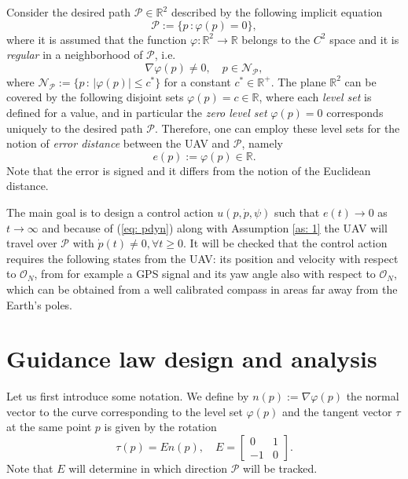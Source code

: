 \documentclass[letterpaper, 10 pt, conference]{ieeeconf}  %
\begin{document}
Consider the desired path $\mathcal{P} \in\mathbb{R}^2$ described by the following implicit equation
\begin{equation}
	\mathcal{P}:= \{p \, : \varphi(p) = 0\},
	\label{eq: P}
\end{equation}
where it is assumed that the function $\varphi : \mathbb{R}^2 \to \mathbb{R}$ belongs to the $C^2$ space and it is \emph{regular} in a neighborhood of $\mathcal{P}$, i.e.
\begin{equation}
	\nabla\varphi(p) \neq 0, \quad p\in \mathcal{N}_{\mathcal{P}},
	\label{eq: reg}
\end{equation}
where $\mathcal{N}_{\mathcal{P}} := \{p \, : \, |\varphi(p)| \leq c^* \}$ for a constant $c^*\in\mathbb{R}^+$.
The plane $\mathbb{R}^2$ can be covered by the following disjoint sets $\varphi(p) = c \in\mathbb{R}$, where each \emph{level set} is defined for a value, and in particular the \emph{zero level set} $\varphi(p) = 0$ corresponds uniquely to the desired path $\mathcal{P}$. Therefore, one can employ these level sets for the notion of \emph{error distance} between the UAV and $\mathcal{P}$, namely
\begin{equation}
	e(p) := \varphi(p) \in \mathbb{R}. \label{eq: e}
\end{equation}
Note that the error is signed and it differs from the notion of the Euclidean distance.

The main goal is to design a control action $u(p, \dot p, \psi)$ such that $e(t) \to 0$ as $t \to \infty$ and because of (\ref{eq: pdyn}) along with Assumption \ref{as: 1} the UAV will travel over $\mathcal{P}$ with $\dot p(t) \neq 0, \forall t\geq 0$. It will be checked that the control action requires the following states from the UAV: its position and velocity with respect to $\mathcal{O}_N$, from for example a GPS signal and its yaw angle also with respect to $\mathcal{O}_N$, which can be obtained from a well calibrated compass in areas far away from the Earth's poles.
\section{Guidance law design and analysis}
\label{sec: ana}
Let us first introduce some notation. We define by $n(p) := \nabla \varphi(p)$ the normal vector to the curve corresponding to the level set $\varphi(p)$ and the tangent vector $\tau$ at the same point $p$ is given by the rotation
\begin{equation}
	\tau(p) = En(p), \quad E=\begin{bmatrix}0 & 1 \\ -1 & 0\end{bmatrix}. \nonumber
\end{equation}
Note that $E$ will determine in which direction $\mathcal{P}$ will be tracked.
\end{document}
